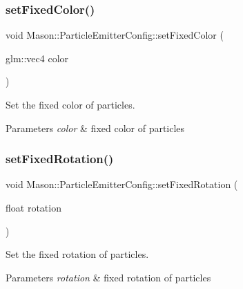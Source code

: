 \subsubsection{\texorpdfstring{set\+Fixed\+Color()}{setFixedColor()}}
{\footnotesize\ttfamily void Mason\+::\+Particle\+Emitter\+Config\+::set\+Fixed\+Color (\begin{DoxyParamCaption}\item[{glm\+::vec4}]{color }\end{DoxyParamCaption})\hspace{0.3cm}{\ttfamily [inline]}}



Set the fixed color of particles. 


\begin{DoxyParams}{Parameters}
{\em color} & fixed color of particles \\
\hline
\end{DoxyParams}
\hypertarget{struct_mason_1_1_particle_emitter_config_acb790846d2a00fd97160fdac66589fd5}{}\label{struct_mason_1_1_particle_emitter_config_acb790846d2a00fd97160fdac66589fd5} 
\subsubsection{\texorpdfstring{set\+Fixed\+Rotation()}{setFixedRotation()}}
{\footnotesize\ttfamily void Mason\+::\+Particle\+Emitter\+Config\+::set\+Fixed\+Rotation (\begin{DoxyParamCaption}\item[{float}]{rotation }\end{DoxyParamCaption})\hspace{0.3cm}{\ttfamily [inline]}}



Set the fixed rotation of particles. 


\begin{DoxyParams}{Parameters}
{\em rotation} & fixed rotation of particles \\
\hline
\end{DoxyParams}
\hypertarget{struct_mason_1_1_particle_emitter_config_a52313455114fadb6609232719681b4d7}{}\label{struct_mason_1_1_particle_emitter_config_a52313455114fadb6609232719681b4d7} 
